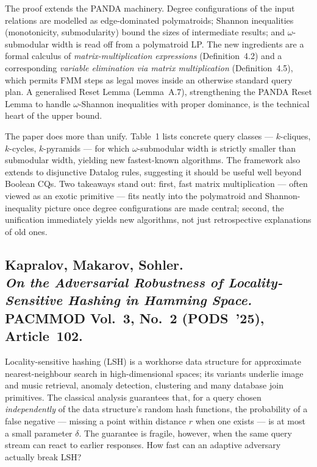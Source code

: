 \documentclass[11pt,a4paper]{article}
\begin{document}
The proof extends the PANDA machinery. Degree configurations of the input
relations are modelled as edge-dominated polymatroids; Shannon inequalities
(monotonicity, submodularity) bound the sizes of intermediate results; and
$\omega$-submodular width is read off from a polymatroid LP. The new
ingredients are a formal calculus of \emph{matrix-multiplication
expressions} (Definition~4.2) and a corresponding \emph{variable
elimination via matrix multiplication} (Definition~4.5), which permits FMM
steps as legal moves inside an otherwise standard query plan. A generalised
Reset Lemma (Lemma~A.7), strengthening the PANDA Reset Lemma to handle
$\omega$-Shannon inequalities with proper dominance, is the technical heart
of the upper bound.

The paper does more than unify. Table~1 lists concrete query classes ---
$k$-cliques, $k$-cycles, $k$-pyramids --- for which $\omega$-submodular
width is strictly smaller than submodular width, yielding new
fastest-known algorithms. The framework also extends to disjunctive Datalog
rules, suggesting it should be useful well beyond Boolean CQs. Two
takeaways stand out: first, fast matrix multiplication --- often viewed as
an exotic primitive --- fits neatly into the polymatroid and
Shannon-inequality picture once degree configurations are made central;
second, the unification immediately yields new algorithms, not just
retrospective explanations of old ones.

\subsection*{Kapralov, Makarov, Sohler.\\
\emph{On the Adversarial Robustness of Locality-Sensitive Hashing in
Hamming Space.}\\
PACMMOD Vol.~3, No.~2 (PODS~'25), Article~102.}

Locality-sensitive hashing (LSH) is a workhorse data structure for
approximate nearest-neighbour search in high-dimensional spaces; its
variants underlie image and music retrieval, anomaly detection, clustering
and many database join primitives. The classical analysis guarantees that,
for a query chosen \emph{independently} of the data structure's random
hash functions, the probability of a false negative --- missing a point
within distance $r$ when one exists --- is at most a small parameter
$\delta$. The guarantee is fragile, however, when the same query stream
can react to earlier responses. How fast can an adaptive adversary actually
break LSH?
\end{document}
